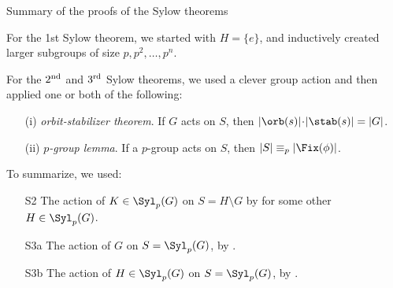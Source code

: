 \documentclass[8pt, handout]{beamer}
\newcommand{\Pause}{}      %
\begin{document}

\begin{frame}{Summary of the proofs of the Sylow theorems}

  For the 1st Sylow theorem, we started with $H=\{e\}$, and
  inductively created larger subgroups of size $p,p^2,\dots,p^n$. 
  
  \Pause\bigskip

  For the $2^{\rm nd}$ and $3^{\rm rd}$ Sylow theorems, we used a
  clever group action and then applied one or both of the
  following: \smallskip\Pause
  \begin{itemize}
    \item[(i)] \emph{\color{xBlue}orbit-stabilizer theorem}. If $G$
      acts on $S$, then $|\orb(s)|\!\cdot\!|\stab(s)|=|G|$. \smallskip\Pause
    \item[(ii)] \emph{\color{xBlue}$p$-group lemma}. If a $p$-group
      acts on $S$, then $|S|\equiv_p|\Fix(\phi)|$.
  \end{itemize}
    
  \Pause\medskip

  To summarize, we used: \smallskip

  \begin{itemize}
    \item[S2] The action of $K\in\Syl_p(G)$ on $S=H\!\setminus\!G$ by
       for some other
      $H\in\Syl_p(G)$. \smallskip\Pause
    \item[S3a] The action of $G$ on $S=\Syl_p(G)$, by
      . \smallskip\Pause
    \item[S3b] The action of $H\in\Syl_p(G)$ on $S=\Syl_p(G)$, by
      .
  \end{itemize}

\end{frame} 

\end{document}
